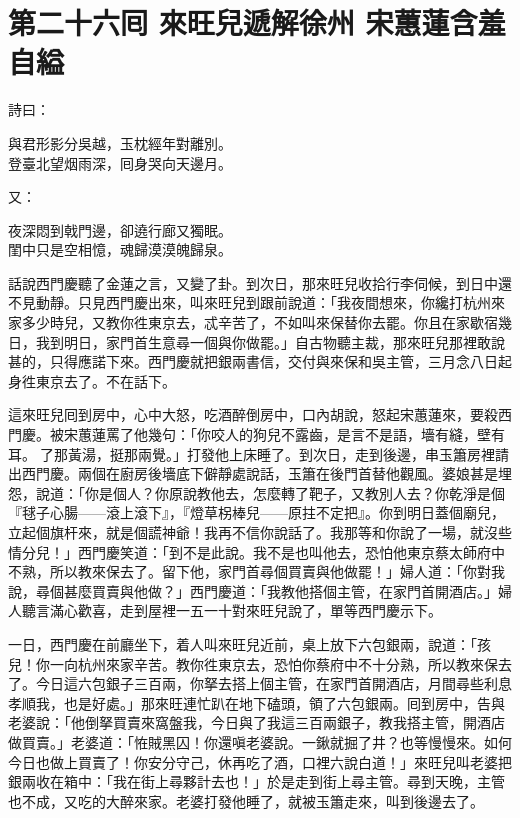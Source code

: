 
\chapter*{第二十六囘 來旺兒遞解徐州 宋蕙蓮含羞自縊}


詩曰：

\begin{myquote}
與君形影分吳越，玉枕經年對離別。\\登臺北望烟雨深，囘身哭向天邊月。
\end{myquote}

又：

\begin{myquote}
夜深悶到戟門邊，卻遶行廊又獨眠。\\閨中只是空相憶，魂歸漠漠魄歸泉。
\end{myquote}

話說西門慶聽了金蓮之言，又變了卦。到次日，那來旺兒收拾行李伺候，到日中還不見動靜。只見西門慶出來，叫來旺兒到跟前說道：「我夜間想來，你纔打杭州來家多少時兒，又教你徃東京去，忒辛苦了，不如叫來保替你去罷。你且在家歇宿幾日，我到明日，家門首生意尋一個與你做罷。」自古物聽主裁，那來旺兒那裡敢說甚的，只得應諾下來。西門慶就把銀兩書信，交付與來保和吳主管，三月念八日起身徃東京去了。不在話下。

這來旺兒囘到房中，心中大怒，{}吃酒醉倒房中，口內胡說，怒起宋蕙蓮來，要殺西門慶。{}被宋蕙蓮罵了他幾句：「你咬人的狗兒不露齒，是言不是語，墻有縫，壁有耳。𠳹了那黃湯，挺那兩覺。」打發他上床睡了。到次日，走到後邊，串玉簫房裡請出西門慶。兩個在廚房後墻底下僻靜處說話，玉簫在後門首替他觀風。婆娘甚是埋怨，說道：「你是個人？你原說教他去，怎麼轉了靶子，又教別人去？你乾淨是個『毬子心腸——滾上滾下』，{}『燈草柺棒兒——原拄不定把』。你到明日蓋個廟兒，立起個旗杆來，就是個謊神爺！我再不信你說話了。我那等和你說了一場，就沒些情分兒！」{}西門慶笑道：「到不是此說。我不是也叫他去，恐怕他東京蔡太師府中不熟，所以教來保去了。留下他，家門首尋個買賣與他做罷！」婦人道：「你對我說，尋個甚麼買賣與他做？」西門慶道：「我教他搭個主管，在家門首開酒店。」婦人聽言滿心歡喜，走到屋裡一五一十對來旺兒說了，{}單等西門慶示下。

一日，西門慶在前廳坐下，着人叫來旺兒近前，桌上放下六包銀兩，說道：「孩兒！你一向杭州來家辛苦。教你徃東京去，恐怕你蔡府中不十分熟，所以教來保去了。今日這六包銀子三百兩，你拏去搭上個主管，在家門首開酒店，月間尋些利息孝順我，也是好處。」那來旺連忙趴在地下磕頭，領了六包銀兩。囘到房中，告與老婆說：「他倒拏買賣來窩盤我，今日與了我這三百兩銀子，教我搭主管，開酒店做買賣。」老婆道：「恠賊黑囚！你還嗔老婆說。一鍬就掘了井？也等慢慢來。如何今日也做上買賣了！你安分守己，休再吃了酒，口裡六說白道！」來旺兒叫老婆把銀兩收在箱中：「我在街上尋夥計去也！」於是走到街上尋主管。尋到天晚，主管也不成，又吃的大醉來家。老婆打發他睡了，就被玉簫走來，叫到後邊去了。

